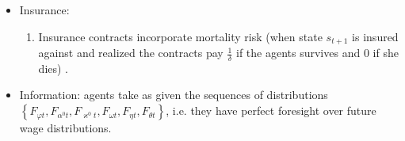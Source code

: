 \documentclass[notes=show]{beamer}
\begin{document}
\begin{frame}%



\begin{itemize}
\item Insurance:

\begin{enumerate}
\item Insurance contracts incorporate mortality risk (when state $s_{t+1}$
is insured against and realized the contracts pay $\frac{1}{\delta }$ if the
agents survives and $0$ if she dies) .
\end{enumerate}

\item Information: agents take as given the sequences of distributions $%
\left\{ F_{\varphi t},F_{\alpha ^{0}t},F_{\varkappa ^{0}t},F_{\omega
t},F_{\eta t},F_{\theta t}\right\} $, i.e. they have perfect foresight over
future wage distributions.
\end{itemize}

\transboxout%
\end{frame}%

\bigskip
\end{document}
